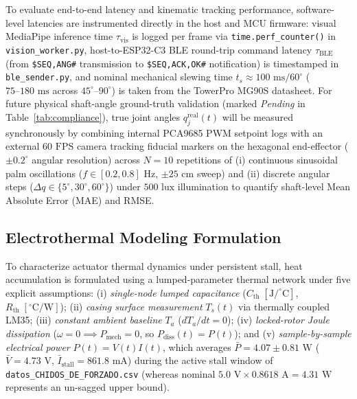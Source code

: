 \documentclass[lettersize,journal]{IEEEtran}
\begin{document}
	To evaluate end-to-end latency and kinematic tracking performance, software-level latencies are instrumented directly in the host and MCU firmware: visual MediaPipe inference time $\tau_{\text{vis}}$ is logged per frame via \texttt{time.perf\_counter()} in \texttt{vision\_worker.py}, host-to-ESP32-C3 BLE round-trip command latency $\tau_{\text{BLE}}$ (from \texttt{\$SEQ,ANG\#} transmission to \texttt{\$SEQ,ACK,OK\#} notification) is timestamped in \texttt{ble\_sender.py}, and nominal mechanical slewing time $t_s \approx 100\text{ ms}/60^\circ$ ($75\text{--}180\text{ ms}$ across $45^\circ\text{--}90^\circ$) is taken from the TowerPro MG90S datasheet. For future physical shaft-angle ground-truth validation (marked \textit{Pending} in Table~\ref{tab:compliance}), true joint angles $q_j^{\text{real}}(t)$ will be measured synchronously by combining internal PCA9685 PWM setpoint logs with an external $60\text{ FPS}$ camera tracking fiducial markers on the hexagonal end-effector ($\pm 0.2^\circ$ angular resolution) across $N = 10$ repetitions of (i) continuous sinusoidal palm oscillations ($f \in [0.2, 0.8]\text{ Hz}$, $\pm 25\text{ cm}$ sweep) and (ii) discrete angular steps ($\Delta q \in \{5^\circ, 30^\circ, 60^\circ\}$) under $500\text{ lux}$ illumination to quantify shaft-level Mean Absolute Error (MAE) and RMSE.
	
	\subsection{Electrothermal Modeling Formulation}
	\label{sec:thermal_modeling}
	
	To characterize actuator thermal dynamics under persistent stall, heat accumulation is formulated using a lumped-parameter thermal network under five explicit assumptions:
	(i) \textit{single-node lumped capacitance} ($C_{\text{th}}\;[\text{J}/^\circ\text{C}]$, $R_{\text{th}}\;[^\circ\text{C}/\text{W}]$);
	(ii) \textit{casing surface measurement} $T_s(t)$ via thermally coupled LM35;
	(iii) \textit{constant ambient baseline} $T_a$ ($dT_a/dt = 0$);
	(iv) \textit{locked-rotor Joule dissipation} ($\omega = 0 \implies P_{\text{mech}} = 0$, so $P_{\text{diss}}(t) = P(t)$); and
	(v) \textit{sample-by-sample electrical power} $P(t) = V(t)I(t)$, which averages $\bar{P} = 4.07 \pm 0.81\text{ W}$ ($\bar{V} = 4.73\text{ V}$, $\bar{I}_{\text{stall}} = 861.8\text{ mA}$) during the active stall window of \texttt{datos\_CHIDOS\_DE\_FORZADO.csv} (whereas nominal $5.0\text{ V} \times 0.8618\text{ A} = 4.31\text{ W}$ represents an un-sagged upper bound).
	
\end{document}

